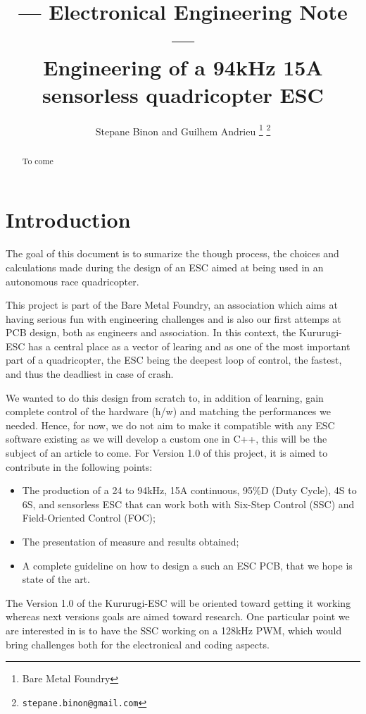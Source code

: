 \documentclass[a4paper, 10pt, conference]{IEEEtran} %
\title{\LARGE \bf
--- Electronical Engineering Note --- \\
Engineering of a 94kHz 15A sensorless quadricopter ESC
}
\author{Stepane Binon and Guilhem Andrieu%
	\thanks{Bare Metal Foundry}
	\thanks{\tt\small stepane.binon@gmail.com}
}
\begin{document}
\maketitle
\thispagestyle{empty}
\pagestyle{empty}

\begin{abstract}
To come
\end{abstract}


\section{Introduction}

The goal of this document is to sumarize the though process, the choices and calculations made during the design of an ESC aimed at being used in an autonomous race quadricopter. 

This project is part of the Bare Metal Foundry, an association which aims at having serious fun with engineering challenges and is also our first attemps at PCB design, both as engineers and association. In this context, the Kururugi-ESC has a central place as a vector of learing and as one of the most important part of a quadricopter, the ESC being the deepest loop of control, the fastest, and thus the deadliest in case of crash. 

We wanted to do this design from scratch to, in addition of learning, gain complete control of the hardware (h/w) and matching the performances we needed. Hence, for now, we do not aim to make it compatible with any ESC software existing as we will develop a custom one in C++, this will be the subject of an article to come. For Version 1.0 of this project, it is aimed to contribute in the following points:
\begin{itemize}
    \item The production of a 24 to 94kHz, 15A continuous, 95\%D (Duty Cycle), 4S to 6S, and sensorless ESC that can work both with Six-Step Control (SSC) and Field-Oriented Control (FOC);
    \item The presentation of measure and results obtained;
    \item A complete guideline on how to design a such an ESC PCB, that we hope is state of the art.
\end{itemize}

The Version 1.0 of the Kururugi-ESC will be oriented toward getting it working whereas next versions goals are aimed toward research. One particular point we are interested in is to have the SSC working on a 128kHz PWM, which would bring challenges both for the electronical and coding aspects.
\end{document}

